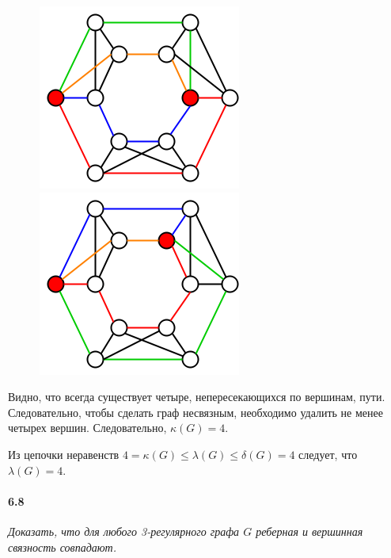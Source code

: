 \documentclass[russian]{article}
\begin{document}
\begin{figure}[H]
\begin{minipage}[t]{0.5\columnwidth}%
\begin{center}
\includegraphics[scale=0.45]{6_7b_4.png}
\par\end{center}%
\end{minipage}\hfill{}%
\begin{minipage}[t]{0.5\columnwidth}%
\begin{center}
\includegraphics[scale=0.45]{6_7b_5.png}
\par\end{center}%
\end{minipage}
\end{figure}


Видно, что всегда существует четыре, непересекающихся по вершинам,
пути. Следовательно, чтобы сделать граф несвязным, необходимо удалить
не менее четырех вершин. Следовательно, $\kappa(G)=4$.

Из цепочки неравенств $4=\kappa(G)\leqslant\lambda(G)\leqslant\delta(G)=4$
следует, что $\lambda(G)=4$.

\paragraph{6.8} \textit{Доказать, что для любого 3-регулярного графа $G$ реберная и вершинная связность совпадают.}
\end{document}
